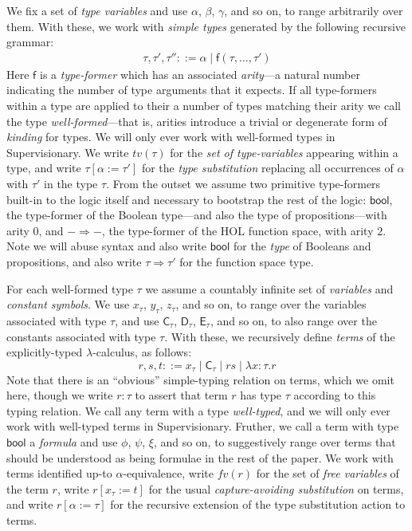 \documentclass[a4paper, UKenglish, cleveref, autoref, thm-restate, colorlinks]{lipics-v2021}
\newcommand{\lam}[1]{\lambda{#1}.}
\begin{document}
We fix a set of \emph{type variables} and use $\alpha$, $\beta$, $\gamma$, and so on, to range arbitrarily over them.
With these, we work with \emph{simple types} generated by the following recursive grammar:
\begin{gather*}
\tau, \tau', \tau'' ::= \alpha \mid \mathsf{f}(\tau, \ldots, \tau')
\end{gather*}
Here $\mathsf{f}$ is a \emph{type-former} which has an associated \emph{arity}---a natural number indicating the number of type arguments that it expects.
If all type-formers within a type are applied to their a number of types matching their arity we call the type \emph{well-formed}---that is, arities introduce a trivial or degenerate form of \emph{kinding} for types.
We will only ever work with well-formed types in Supervisionary.
We write $tv(\tau)$ for the \emph{set of type-variables} appearing within a type, and write $\tau[\alpha := \tau']$ for the \emph{type substitution} replacing all occurrences of $\alpha$ with $\tau'$ in the type $\tau$.
From the outset we assume two primitive type-formers built-in to the logic itself and necessary to bootstrap the rest of the logic: $\mathsf{bool}$, the type-former of the Boolean type---and also the type of propositions---with arity $0$, and $- \Rightarrow -$, the type-former of the HOL function space, with arity $2$.
Note we will abuse syntax and also write $\mathsf{bool}$ for the \emph{type} of Booleans and propositions, and also write $\tau \Rightarrow \tau'$ for the function space type.

For each well-formed type $\tau$ we assume a countably infinite set of \emph{variables} and \emph{constant symbols}.
We use $x_\tau$, $y_\tau$, $z_\tau$, and so on, to range over the variables associated with type $\tau$, and use $\mathsf{C}_\tau$, $\mathsf{D}_\tau$, $\mathsf{E}_\tau$, and so on, to also range over the constants associated with type $\tau$.
With these, we recursively define \emph{terms} of the explicitly-typed $\lambda$-calculus, as follows:
\begin{displaymath}
r, s, t ::= x_\tau \mid \mathsf{C}_\tau \mid rs \mid \lam{x{:}\tau}r
\end{displaymath}
Note that there is an ``obvious'' simple-typing relation on terms, which we omit here, though we write $r : \tau$ to assert that term $r$ has type $\tau$ according to this typing relation.
We call any term with a type \emph{well-typed}, and we will only ever work with well-typed terms in Supervisionary.
Fruther, we call a term with type $\mathsf{bool}$ a \emph{formula} and use $\phi$, $\psi$, $\xi$, and so on, to suggestively range over terms that should be understood as being formulae in the rest of the paper.
We work with terms identified up-to $\alpha$-equivalence, write $fv(r)$ for the set of \emph{free variables} of the term $r$, write $r[x_\tau := t]$ for the usual \emph{capture-avoiding substitution} on terms, and write $r[\alpha := \tau]$ for the recursive extension of the type substitution action to terms.
\end{document}
